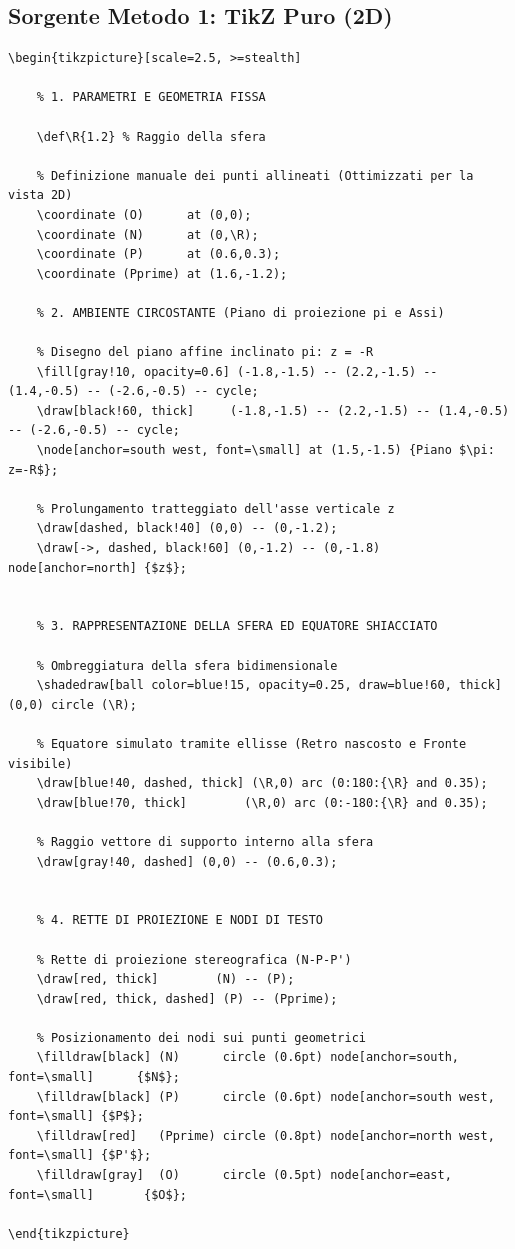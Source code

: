 \documentclass[11pt]{article}
\begin{document}
\subsection*{Sorgente Metodo 1: TikZ Puro (2D)}
\begin{lstlisting}
\begin{tikzpicture}[scale=2.5, >=stealth]
    
    % 1. PARAMETRI E GEOMETRIA FISSA

    \def\R{1.2} % Raggio della sfera
    
    % Definizione manuale dei punti allineati (Ottimizzati per la vista 2D)
    \coordinate (O)      at (0,0);
    \coordinate (N)      at (0,\R);
    \coordinate (P)      at (0.6,0.3);
    \coordinate (Pprime) at (1.6,-1.2); 
    
    % 2. AMBIENTE CIRCOSTANTE (Piano di proiezione pi e Assi)

    % Disegno del piano affine inclinato pi: z = -R
    \fill[gray!10, opacity=0.6] (-1.8,-1.5) -- (2.2,-1.5) -- (1.4,-0.5) -- (-2.6,-0.5) -- cycle;
    \draw[black!60, thick]     (-1.8,-1.5) -- (2.2,-1.5) -- (1.4,-0.5) -- (-2.6,-0.5) -- cycle;
    \node[anchor=south west, font=\small] at (1.5,-1.5) {Piano $\pi: z=-R$};
    
    % Prolungamento tratteggiato dell'asse verticale z
    \draw[dashed, black!40] (0,0) -- (0,-1.2);
    \draw[->, dashed, black!60] (0,-1.2) -- (0,-1.8) node[anchor=north] {$z$};
    
    
    % 3. RAPPRESENTAZIONE DELLA SFERA ED EQUATORE SHIACCIATO
    
    % Ombreggiatura della sfera bidimensionale
    \shadedraw[ball color=blue!15, opacity=0.25, draw=blue!60, thick] (0,0) circle (\R);
    
    % Equatore simulato tramite ellisse (Retro nascosto e Fronte visibile)
    \draw[blue!40, dashed, thick] (\R,0) arc (0:180:{\R} and 0.35); 
    \draw[blue!70, thick]        (\R,0) arc (0:-180:{\R} and 0.35); 
    
    % Raggio vettore di supporto interno alla sfera
    \draw[gray!40, dashed] (0,0) -- (0.6,0.3); 
    
    
    % 4. RETTE DI PROIEZIONE E NODI DI TESTO
    
    % Rette di proiezione stereografica (N-P-P')
    \draw[red, thick]        (N) -- (P);
    \draw[red, thick, dashed] (P) -- (Pprime);
    
    % Posizionamento dei nodi sui punti geometrici
    \filldraw[black] (N)      circle (0.6pt) node[anchor=south, font=\small]      {$N$};
    \filldraw[black] (P)      circle (0.6pt) node[anchor=south west, font=\small] {$P$};
    \filldraw[red]   (Pprime) circle (0.8pt) node[anchor=north west, font=\small] {$P'$};
    \filldraw[gray]  (O)      circle (0.5pt) node[anchor=east, font=\small]       {$O$};
    
\end{tikzpicture}
\end{lstlisting}
\end{document}

